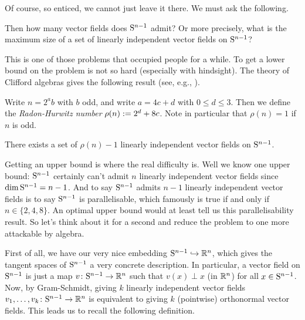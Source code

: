 Of course, so enticed, we cannot just leave it there. We must ask the
following.

\begin{question}
  \label{vfield-prob}
  Then how many vector fields does $\S^{n-1}$ admit? Or more
  precisely, what is the maximum size of a set of linearly independent
  vector fields on $\S^{n-1}$?
\end{question}

This is one of those problems that occupied people for a while. To get
a lower bound on the problem is not so hard (especially with
hindsight). The theory of Clifford algebras gives the following result
(see, e.g., \cite{hopkins-256y, miller-vfields}).

\begin{definition}
  \label{radon-hurwitz}
  Write $n = 2^ab$ with $b$ odd, and write $a = 4c + d$ with $0 \le d
  \le 3$. Then we define the \emph{Radon-Hurwitz number} $\rho(n) \ce
  2^d + 8c$. Note in particular that $\rho(n) = 1$ if $n$ is odd.
\end{definition}

\begin{theorem}
  \label{vfield-lower-bound}
  There exists a set of $\rho(n)-1$ linearly independent vector fields
  on $\S^{n-1}$.
\end{theorem}

Getting an upper bound is where the real difficulty is. Well we know
one upper bound: $\S^{n-1}$ certainly can't admit $n$ linearly
independent vector fields since $\dim \S^{n-1} = n - 1$. And to say
$\S^{n-1}$ admits $n-1$ linearly independent vector fields is to say
$\S^{n-1}$ is parallelisable, which famously is true if and only if $n
\in \{2,4,8\}$. An optimal upper bound would at least tell us this
parallelisability result. So let's think about it for a second and
reduce the problem to one more attackable by algebra.

\begin{nothing}
  \label{gram-schmidt}
  First of all, we have our very nice embedding $\S^{n-1} \inj \R^n$,
  which gives the tangent spaces of $\S^{n-1}$ a very concrete
  description. In particular, a vector field on $\S^{n-1}$ is just a
  map $v \c \S^{n-1} \to \R^n$ such that $v(x) \perp x$ (in $\R^n$)
  for all $x \in \S^{n-1}$. Now, by Gram-Schmidt, giving $k$ linearly
  independent vector fields $v_1,\ldots,v_k \c \S^{n-1} \to \R^n$ is
  equivalent to giving $k$ (pointwise) orthonormal vector fields. This
  leads us to recall the following definition.
\end{nothing}

